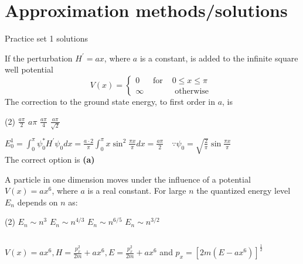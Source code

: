 \chapter{Approximation methods/solutions}
\begin{abox}
	Practice set 1 solutions
	\end{abox}
\begin{enumerate}
\begin{minipage}{\textwidth}
	\item If the perturbation $H^{\prime}=a x$, where $a$ is a constant, is added to the infinite square well potential
	$$
	V(x)=\left\{\begin{array}{lll}
	0 & \text { for } & 0 \leq x \leq \pi \\
	\infty & & \text { otherwise }
	\end{array}\right.
	$$
	The correction to the ground state energy, to first order in $a$, is
\end{minipage}
\begin{tasks}(2)
	\task[\textbf{A.}] $\frac{a \pi}{2}$
	\task[\textbf{B.}]$a \pi$
	\task[\textbf{C.}]$\frac{a \pi}{4}$
	\task[\textbf{D.}]$\frac{a \pi}{\sqrt{2}}$
\end{tasks}
\begin{answer}
	$E_{0}^{1}=\int_{0}^{\pi} \psi_{0}^{*} H^{\prime} \psi_{0} d x=\frac{a \cdot 2}{\pi} \int_{0}^{\pi} x \sin ^{2} \frac{\pi x}{\pi} d x=\frac{a \pi}{2} \quad \because \psi_{0}=\sqrt{\frac{2}{\pi}} \sin \frac{\pi x}{\pi}$\\
	The correct option is \textbf{(a)}	
\end{answer}
\begin{minipage}{\textwidth}
	\item A particle in one dimension moves under the influence of a potential $V(x)=a x^{6}$, where $a$ is a real constant. For large $n$ the quantized energy level $E_{n}$ depends on $n$ as:
\end{minipage}
\begin{tasks}(2)
	\task[\textbf{A.}] $E_{n} \sim n^{3}$
	\task[\textbf{B.}]$E_{n} \sim n^{4 / 3}$
	\task[\textbf{C.}]$E_{n} \sim n^{6 / 5}$
	\task[\textbf{D.}]$E_{n} \sim n^{3 / 2}$
\end{tasks}
\begin{answer}$\left. \right. $\\
	\begin{minipage}{0.5\textwidth}
		$V(x)=a x^{6}, H=\frac{p_{x}^{2}}{2 m}+a x^{6}, E=\frac{p_{x}^{2}}{2 m}+a x^{6}$ and $p_{x}=\left[2 m\left(E-a x^{6}\right)\right]^{\frac{1}{2}}$\\

\end{minipage}
\end{answer}
\end{enumerate}
